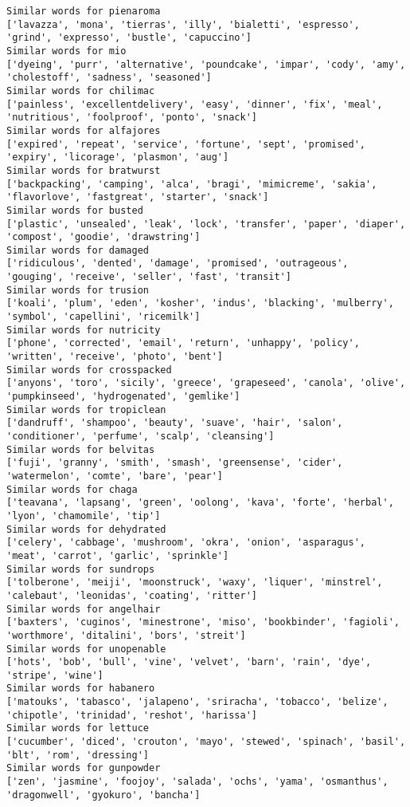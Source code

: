\documentclass[11pt]{article}
\begin{document}
\begin{Verbatim}[commandchars=\\\{\}]
Similar words for pienaroma
['lavazza', 'mona', 'tierras', 'illy', 'bialetti', 'espresso', 'grind', 'expresso', 'bustle', 'capuccino']
Similar words for mio
['dyeing', 'purr', 'alternative', 'poundcake', 'impar', 'cody', 'amy', 'cholestoff', 'sadness', 'seasoned']
Similar words for chilimac
['painless', 'excellentdelivery', 'easy', 'dinner', 'fix', 'meal', 'nutritious', 'foolproof', 'ponto', 'snack']
Similar words for alfajores
['expired', 'repeat', 'service', 'fortune', 'sept', 'promised', 'expiry', 'licorage', 'plasmon', 'aug']
Similar words for bratwurst
['backpacking', 'camping', 'alca', 'bragi', 'mimicreme', 'sakia', 'flavorlove', 'fastgreat', 'starter', 'snack']
Similar words for busted
['plastic', 'unsealed', 'leak', 'lock', 'transfer', 'paper', 'diaper', 'compost', 'goodie', 'drawstring']
Similar words for damaged
['ridiculous', 'dented', 'damage', 'promised', 'outrageous', 'gouging', 'receive', 'seller', 'fast', 'transit']
Similar words for trusion
['koali', 'plum', 'eden', 'kosher', 'indus', 'blacking', 'mulberry', 'symbol', 'capellini', 'ricemilk']
Similar words for nutricity
['phone', 'corrected', 'email', 'return', 'unhappy', 'policy', 'written', 'receive', 'photo', 'bent']
Similar words for crosspacked
['anyons', 'toro', 'sicily', 'greece', 'grapeseed', 'canola', 'olive', 'pumpkinseed', 'hydrogenated', 'gemlike']
Similar words for tropiclean
['dandruff', 'shampoo', 'beauty', 'suave', 'hair', 'salon', 'conditioner', 'perfume', 'scalp', 'cleansing']
Similar words for belvitas
['fuji', 'granny', 'smith', 'smash', 'greensense', 'cider', 'watermelon', 'comte', 'bare', 'pear']
Similar words for chaga
['teavana', 'lapsang', 'green', 'oolong', 'kava', 'forte', 'herbal', 'lyon', 'chamomile', 'tip']
Similar words for dehydrated
['celery', 'cabbage', 'mushroom', 'okra', 'onion', 'asparagus', 'meat', 'carrot', 'garlic', 'sprinkle']
Similar words for sundrops
['tolberone', 'meiji', 'moonstruck', 'waxy', 'liquer', 'minstrel', 'calebaut', 'leonidas', 'coating', 'ritter']
Similar words for angelhair
['baxters', 'cuginos', 'minestrone', 'miso', 'bookbinder', 'fagioli', 'worthmore', 'ditalini', 'bors', 'streit']
Similar words for unopenable
['hots', 'bob', 'bull', 'vine', 'velvet', 'barn', 'rain', 'dye', 'stripe', 'wine']
Similar words for habanero
['matouks', 'tabasco', 'jalapeno', 'sriracha', 'tobacco', 'belize', 'chipotle', 'trinidad', 'reshot', 'harissa']
Similar words for lettuce
['cucumber', 'diced', 'crouton', 'mayo', 'stewed', 'spinach', 'basil', 'blt', 'rom', 'dressing']
Similar words for gunpowder
['zen', 'jasmine', 'foojoy', 'salada', 'ochs', 'yama', 'osmanthus', 'dragonwell', 'gyokuro', 'bancha']

\end{Verbatim}
\end{document}
